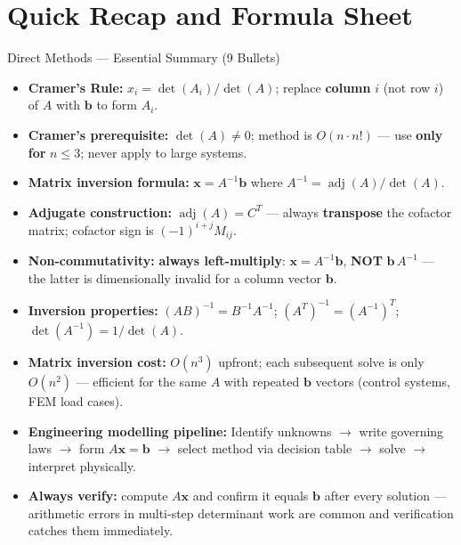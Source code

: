 \documentclass[12pt,a4paper]{article}
\begin{document}
\section{Quick Recap and Formula Sheet}

\begin{learnbox}{Direct Methods --- Essential Summary (9 Bullets)}
\begin{itemize}[noitemsep]
  \item \textbf{Cramer's Rule:} $x_i = \det(A_i)/\det(A)$; replace \textbf{column} $i$ (not row $i$) of $A$ with $\mathbf{b}$ to form $A_i$.
  \item \textbf{Cramer's prerequisite:} $\det(A) \neq 0$; method is $O(n\cdot n!)$ --- use \textbf{only for} $n \leq 3$; never apply to large systems.
  \item \textbf{Matrix inversion formula:} $\mathbf{x} = A^{-1}\mathbf{b}$ where $A^{-1} = \operatorname{adj}(A)/\det(A)$.
  \item \textbf{Adjugate construction:} $\operatorname{adj}(A) = C^T$ --- always \textbf{transpose} the cofactor matrix; cofactor sign is $(-1)^{i+j}M_{ij}$.
  \item \textbf{Non-commutativity:} \textbf{always left-multiply}: $\mathbf{x} = A^{-1}\mathbf{b}$, \textbf{NOT} $\mathbf{b}\,A^{-1}$ --- the latter is dimensionally invalid for a column vector $\mathbf{b}$.
  \item \textbf{Inversion properties:} $(AB)^{-1} = B^{-1}A^{-1}$; $(A^T)^{-1} = (A^{-1})^T$; $\det(A^{-1}) = 1/\det(A)$.
  \item \textbf{Matrix inversion cost:} $O(n^3)$ upfront; each subsequent solve is only $O(n^2)$ --- efficient for the same $A$ with repeated $\mathbf{b}$ vectors (control systems, FEM load cases).
  \item \textbf{Engineering modelling pipeline:} Identify unknowns $\to$ write governing laws $\to$ form $A\mathbf{x}=\mathbf{b}$ $\to$ select method via decision table $\to$ solve $\to$ interpret physically.
  \item \textbf{Always verify:} compute $A\mathbf{x}$ and confirm it equals $\mathbf{b}$ after every solution --- arithmetic errors in multi-step determinant work are common and verification catches them immediately.
\end{itemize}
\end{learnbox}
\end{document}
